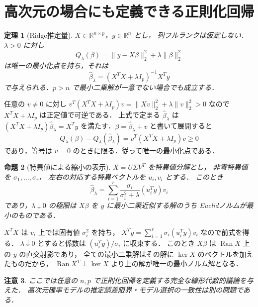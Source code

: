\documentclass[a5paper,10pt,onecolumn]{jsarticle}
\makeatletter
\theoremstyle{mathnotetheorem}
\newtheorem{theorem}{定理}[section]
\newtheorem{proposition}[theorem]{命題}
\newtheorem{remark}[theorem]{注意}
\renewcommand{\proofname}{証明}
\renewenvironment{proof}[1][\proofname]{%
  \par\pushQED{\qed}\normalfont\topsep4\p@\@plus2\p@\relax
  \trivlist\item[\hskip\labelsep\bfseries #1]\ignorespaces
}{\popQED\endtrivlist\@endpefalse}
\newcommand{\norm}[1]{\lVert #1\rVert}
\makeatother
\begin{document}
\section{高次元の場合にも定義できる正則化回帰}
\begin{theorem}[Ridge推定量]
$X\in\mathbb R^{n\times p}$，$y\in\mathbb R^n$ とし，
列フルランクは仮定しない．$\lambda>0$ に対し
\[
 Q_\lambda(\beta)=\norm{y-X\beta}_2^2+
                    \lambda\norm\beta_2^2
\]
は唯一の最小化点を持ち，それは
\[
 \widehat\beta_\lambda
 =(X^TX+\lambda I_p)^{-1}X^Ty
\]
で与えられる．$p>n$ で最小二乗解が一意でない場合でも成立する．
\end{theorem}
\begin{proof}
任意の $v\ne0$ に対し
$v^T(X^TX+\lambda I_p)v=\norm{Xv}_2^2+\lambda\norm v_2^2>0$
なので $X^TX+\lambda I_p$ は正定値で可逆である．
上式で定まる $\widehat\beta_\lambda$ は
$(X^TX+\lambda I_p)\widehat\beta_\lambda=X^Ty$
を満たす．$\beta=\widehat\beta_\lambda+v$ と書いて展開すると
\[
 Q_\lambda(\beta)-Q_\lambda(\widehat\beta_\lambda)
 =v^T(X^TX+\lambda I_p)v\ge0
\]
であり，等号は $v=0$ のときに限る．従って唯一の最小化点である．
\end{proof}
\begin{proposition}[特異値による縮小の表示]
$X=U\Sigma V^T$ を特異値分解とし，
非零特異値を $\sigma_1,\ldots,\sigma_r$，
左右の対応する特異ベクトルを $u_i,v_i$ とする．
このとき
\[
 \widehat\beta_\lambda
 =\sum_{i=1}^r\frac{\sigma_i}{\sigma_i^2+\lambda}
             (u_i^Ty)v_i
\]
であり，$\lambda\downarrow0$ の極限は
$X\beta$ を $y$ に最小二乗近似する解のうち
Euclidノルムが最小のものである．
\end{proposition}
\begin{proof}
$X^TX$ は $v_i$ 上では固有値 $\sigma_i^2$ を持ち，
$X^Ty=\sum_{i=1}^r\sigma_i(u_i^Ty)v_i$ なので前式を得る．
$\lambda\downarrow0$ とすると係数は
$(u_i^Ty)/\sigma_i$ に収束する．
このとき $X\beta$ は $\operatorname{Ran}X$ 上の $y$ の直交射影であり，
全ての最小二乗解はその解に $\ker X$ のベクトルを加えたものだから，
$\operatorname{Ran}X^T\perp\ker X$ より上の解が唯一の最小ノルム解となる．
\end{proof}
\begin{remark}
ここでは任意の $n,p$ で正則化回帰を定義する完全な線形代数的議論を与えた．
高次元確率モデルの推定誤差限界・モデル選択の一致性は別の問題である．
\end{remark}
\end{document}
